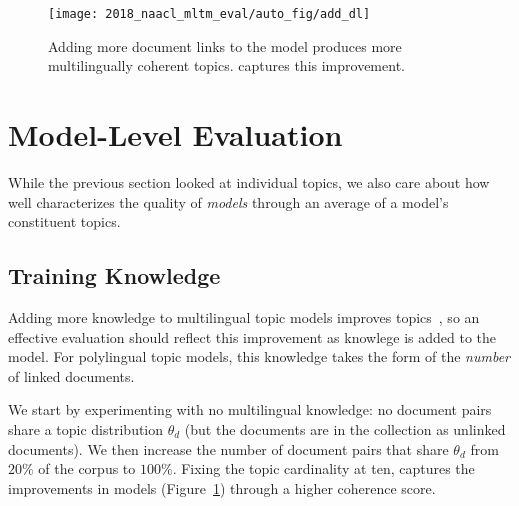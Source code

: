 \begin{figure}[t!]
	\centering
	\texttt{[image: 2018\_naacl\_mltm\_eval/auto\_fig/add\_dl]}
	\caption{Adding more document links to the model produces more
          multilingually coherent topics. \cnpmi{} captures this
          improvement.}
	\label{fig:add-links}
\end{figure}


\section{Model-Level Evaluation}
\label{sec:model-level}

While the previous section looked at individual topics,  we also care about
how well \cnpmi{} characterizes the quality of \emph{models}
through an average of a model's constituent topics.



\subsection{Training Knowledge}
\label{sec:add-link}

Adding more knowledge to multilingual topic models improves
topics~\cite{HuZEB14}, so an effective evaluation should reflect
this improvement as knowlege is added to the model.
For polylingual topic models, this knowledge takes the form of the
\emph{number} of linked documents.

We start by experimenting with no multilingual knowledge: no document
pairs share a topic distribution $\theta_d$ (but the documents are in
the collection as unlinked documents).  We then increase the number of
document pairs that share $\theta_d$ from $20\%$ of the corpus to
$100\%$.  Fixing the topic cardinality at ten, \cnpmi{} captures the
improvements in models (Figure~\ref{fig:add-links}) through a higher
coherence score.


